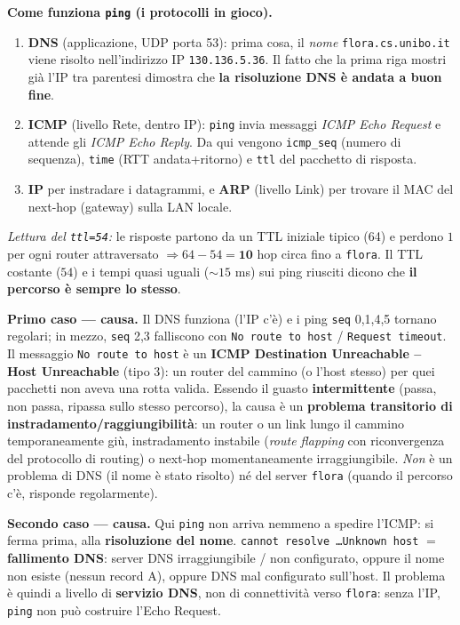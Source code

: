 \documentclass{report}
\begin{document}
\begin{solution}
\textbf{Come funziona \texttt{ping} (i protocolli in gioco).}
\begin{enumerate}
\item \textbf{DNS} (applicazione, UDP porta 53): prima cosa, il \emph{nome}
\texttt{flora.cs.unibo.it} viene risolto nell'indirizzo IP
\texttt{130.136.5.36}. Il fatto che la prima riga mostri già l'IP tra parentesi
dimostra che \textbf{la risoluzione DNS è andata a buon fine}.
\item \textbf{ICMP} (livello Rete, dentro IP): \texttt{ping} invia messaggi
\emph{ICMP Echo Request} e attende gli \emph{ICMP Echo Reply}. Da qui vengono
\texttt{icmp\_seq} (numero di sequenza), \texttt{time} (RTT andata+ritorno) e
\texttt{ttl} del pacchetto di risposta.
\item \textbf{IP} per instradare i datagrammi, e \textbf{ARP} (livello Link) per
trovare il MAC del next-hop (gateway) sulla LAN locale.
\end{enumerate}
\emph{Lettura del \texttt{ttl=54}:} le risposte partono da un TTL iniziale tipico
(64) e perdono $1$ per ogni router attraversato $\Rightarrow 64-54 = \mathbf{10}$
hop circa fino a \texttt{flora}. Il TTL costante ($54$) e i tempi quasi uguali
($\sim15$ ms) sui ping riusciti dicono che \textbf{il percorso è sempre lo stesso}.

\medskip
\noindent\textbf{Primo caso --- causa.} Il DNS funziona (l'IP c'è) e i ping
\texttt{seq} 0,1,4,5 tornano regolari; in mezzo, \texttt{seq} 2,3 falliscono con
\texttt{No route to host} / \texttt{Request timeout}. Il messaggio
\texttt{No route to host} è un \textbf{ICMP Destination Unreachable -- Host
Unreachable} (tipo 3): un router del cammino (o l'host stesso) per quei pacchetti
non aveva una rotta valida. Essendo il guasto \textbf{intermittente} (passa, non
passa, ripassa sullo stesso percorso), la causa è un \textbf{problema transitorio
di instradamento/raggiungibilità}: un router o un link lungo il cammino
temporaneamente giù, instradamento instabile (\emph{route flapping} con
riconvergenza del protocollo di routing) o next-hop momentaneamente irraggiungibile.
\emph{Non} è un problema di DNS (il nome è stato risolto) né del server
\texttt{flora} (quando il percorso c'è, risponde regolarmente).

\medskip
\noindent\textbf{Secondo caso --- causa.} Qui \texttt{ping} non arriva nemmeno a
spedire l'ICMP: si ferma prima, alla \textbf{risoluzione del nome}.
\texttt{cannot resolve \dots Unknown host} $=$ \textbf{fallimento DNS}: server DNS
irraggiungibile / non configurato, oppure il nome non esiste (nessun record A),
oppure DNS mal configurato sull'host. Il problema è quindi a livello di
\textbf{servizio DNS}, non di connettività verso \texttt{flora}: senza l'IP,
\texttt{ping} non può costruire l'Echo Request.
\end{solution}
\end{document}
